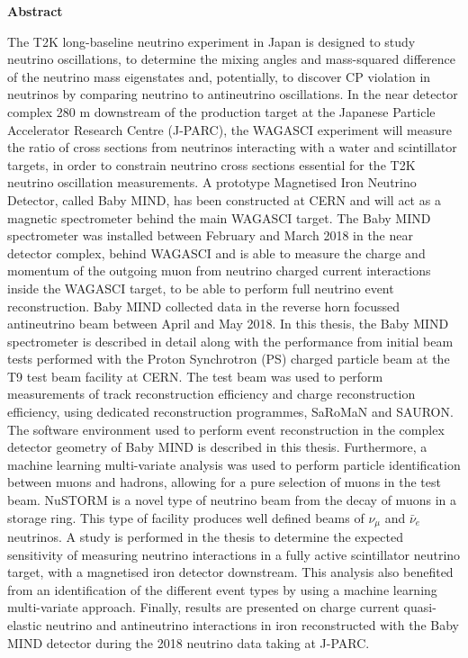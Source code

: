 \vspace*{0.75in}
\begin{center} {\bf Abstract}\end{center}

The T2K long-baseline neutrino experiment in Japan is designed to study neutrino oscillations, to determine the mixing angles and mass-squared difference of the neutrino mass eigenstates and, potentially, to discover CP violation in neutrinos by comparing neutrino to antineutrino oscillations. In the near detector complex 280 m downstream of the production target at the Japanese Particle Accelerator Research Centre (J-PARC), the WAGASCI experiment will measure the ratio of cross sections from neutrinos interacting with a water and scintillator targets, in order to constrain neutrino cross sections essential for the T2K neutrino oscillation measurements. A prototype Magnetised Iron Neutrino Detector, called Baby MIND, has been constructed at CERN and will act as a magnetic spectrometer behind the main WAGASCI target. The Baby MIND spectrometer was installed between February and March 2018 in the near detector complex, behind WAGASCI and is able to measure the charge and momentum of the outgoing muon from neutrino charged current interactions inside the WAGASCI target, to be able to perform full neutrino event reconstruction. Baby MIND collected data in the reverse horn focussed antineutrino beam between April and May 2018. In this thesis, the Baby MIND spectrometer is described in detail along with the performance from initial beam tests performed with the Proton Synchrotron (PS) charged particle beam at the T9 test beam facility at CERN. The test beam was used to perform measurements of track reconstruction efficiency and charge reconstruction efficiency, using dedicated reconstruction programmes, SaRoMaN and SAURON. The software environment used to perform event reconstruction in the complex detector geometry of Baby MIND is described in this thesis. Furthermore, a machine learning multi-variate analysis was used to perform particle identification between muons and hadrons, allowing for a pure selection of muons in the test beam. NuSTORM is a novel type of neutrino beam from the decay of muons in a storage ring. This type of facility produces well defined beams of $\nu_\mu$ and $\bar{\nu}_e$ neutrinos. A study is performed in the thesis to determine the expected sensitivity of measuring neutrino interactions in a fully active scintillator neutrino target, with a magnetised iron detector downstream. This analysis also benefited from an identification of the different event types by using a machine learning multi-variate approach. Finally, results are presented on charge current quasi-elastic neutrino and antineutrino interactions in iron reconstructed with the Baby MIND detector during the 2018 neutrino data taking at J-PARC.

